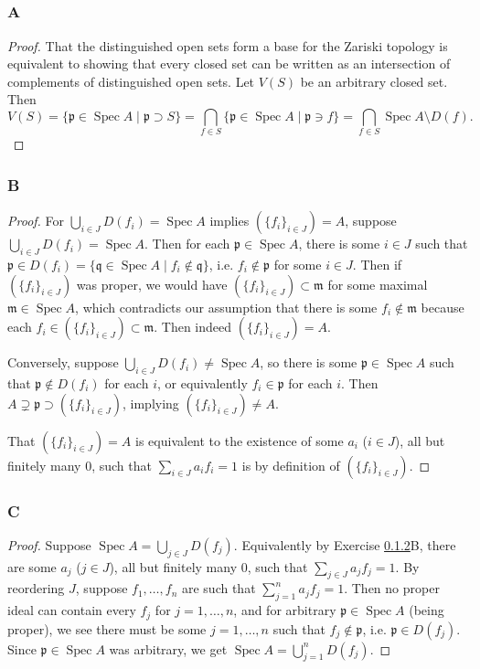 \documentclass{article}
\newcommand{\frkm}{\mathfrak{m}}
\newcommand{\frkp}{\mathfrak{p}}
\newcommand{\frkq}{\mathfrak{q}}
\DeclareMathOperator{\Spec}{\mathrm{Spec}}
\begin{document}
\subsection{}
\subsubsection{A}\label{3.5.A}
\begin{proof}
    That the distinguished open sets form a base for the Zariski topology is equivalent to showing that every closed set can be written as an intersection of complements of distinguished open sets. Let $V(S)$ be an arbitrary closed set. Then
    \[
    V(S)=\{\frkp \in \Spec A \mid \frkp \supset S\} = \bigcap_{f\in S} \{\frkp \in \Spec A \mid \frkp \ni f\}=\bigcap_{f\in S} \Spec A \setminus D(f).
    \]
\end{proof}
\subsubsection{B}\label{3.5.B}
\begin{proof}
    For $\bigcup_{i\in J} D(f_i) = \Spec A$ implies $(\{f_i\}_{i \in J})=A$, suppose $\bigcup_{i\in J} D(f_i)= \Spec A$. Then for each $\frkp \in \Spec A$, there is some $i\in J$ such that $\frkp \in D(f_i) = \{ \frkq \in \Spec A \mid f_i \notin \frkq\}$, i.e. $f_i \notin \frkp$ for some $i\in J$. Then if $(\{f_i\}_{i \in J})$ was proper, we would have $(\{f_i\}_{i \in J})\subset \frkm$ for some maximal $\frkm \in \Spec A$, which contradicts our assumption that there is some $f_i \notin \frkm$ because each $f_i \in (\{f_i\}_{i \in J})\subset \frkm$. Then indeed $(\{f_i\}_{i \in J})= A$.

    Conversely, suppose $\bigcup_{i\in J} D(f_i) \ne \Spec A$, so there is some $\frkp \in \Spec A$ such that $\frkp \notin D(f_i)$ for each $i$, or equivalently $f_i \in \frkp$ for each $i$. Then $A\supsetneq \frkp \supset (\{f_i\}_{i\in J})$, implying $(\{f_i\}_{i\in J}) \ne A$.

    That $(\{f_i\}_{i \in J})=A$ is equivalent to the existence of some $a_i$ ($i\in J$), all but finitely many $0$, such that $\sum_{i\in J} a_i f_i = 1$ is by definition of $(\{f_i\}_{i \in J})$.
\end{proof}
\subsubsection{C}\label{3.5.C}
\begin{proof}
    Suppose $\Spec A = \bigcup_{j\in J} D(f_j)$. Equivalently by Exercise \ref{3.5.B}B, there are some $a_j$ ($j\in J$), all but finitely many $0$, such that $\sum_{j\in J} a_j f_j = 1$. By reordering $J$, suppose $f_1,\dots,f_n$ are such that $\sum_{j=1}^n a_j f_j=1$. Then no proper ideal can contain every $f_j$ for $j=1,\dots, n$, and for arbitrary $\frkp \in \Spec A$ (being proper), we see there must be some $j=1,\dots, n$ such that $f_j\notin \frkp$, i.e. $\frkp \in D(f_j)$. Since $\frkp \in \Spec A$ was arbitrary, we get $\Spec A = \bigcup_{j=1}^n D(f_j)$. 
\end{proof}
\end{document}
